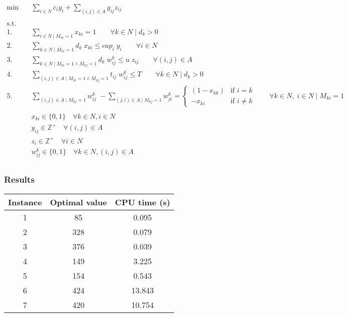 \begin{align*}
    \min \quad & \sum_{i \in N} c_i y_i + \sum_{(i, j) \in A} g_{ij} z_{ij} & \\
	\\
    \text{s.t.} \quad &  \\
	1. \quad & \sum_{i \in N \mid M_{ki} = 1} x_{ki} = 1 \qquad \forall k \in N \mid d_k > 0  \\
	2. \quad & \sum_{k \in N \mid M_{ki} = 1} d_k \; x_{ki} \le cap_i \; y_i \qquad \forall i \in N  \\
	3. \quad & \sum_{k \in N \mid M_{ki} = 1 \land M_{kj} = 1} d_k \; w_{ij}^k \le u \; z_{ij} \qquad \forall (i, j) \in A \quad  \\
	4. \quad & \sum_{(i, j) \in A \mid M_{ki} = 1 \land M_{kj} = 1} t_{ij} \; w_{ij}^k \le T \qquad \forall k \in N \mid d_k > 0  \\
	5. \quad & \sum_{(i, j) \in A \mid M_{kj} = 1} w_{ij}^k \; - \sum_{(j, i) \in A \mid M_{kj} = 1} w_{ji}^k = \left\{
	\begin{array}{rl}
		(1 - x_{kk}) & \text{if } i = k  \\
		-x_{ki} & \text{if } i \ne k
	\end{array}
	\right.
	\qquad \forall k \in N, \; i \in N \mid M_{ki} = 1  \\
	\\
	& x_{ki} \in \{0, 1\} \quad \forall k \in N, i \in N  \\
	& y_{ij} \in \mathbb{Z}^+ \quad \forall (i, j) \in A  \\
	& z_i \in \mathbb{Z}^+ \quad \forall i \in N  \\
	& w_{ij}^k \in \{0, 1\} \quad \forall k \in N, (i, j) \in A  \\
\end{align*}


\subsubsection*{Results}

\begin{table}[h!]
	\centering
	\begin{tabular}{|c|c|c|}
		\hline
		\textbf{Instance} & \textbf{Optimal value} & \textbf{CPU time (s)} \\
		\hline
		1 & 85  & 0.095 \\
		\hline
		2 & 328 & 0.079 \\
		\hline
		3 & 376 & 0.039 \\
		\hline
		4 & 149 & 3.225 \\
		\hline
		5 & 154 & 0.543 \\
		\hline
		6 & 424 & 13.843 \\
		\hline
		7 & 420 & 10.754 \\
		\hline
	\end{tabular}
	\label{tab:instance_costs}
\end{table}
